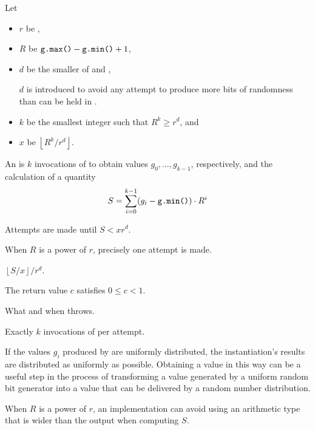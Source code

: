 \begin{itemdescr}
\pnum
Let
\begin{itemize}
\item $r$ be ,
\item $R$ be $\texttt{\protect g.max()} - \texttt{\protect g.min()} + 1$,
\item $d$ be the smaller of
   and ,
  \begin{footnote}
  $d$ is introduced to avoid any attempt
  to produce more bits of randomness
  than can be held in .
  \end{footnote}
\item $k$ be the smallest integer such that $R^k \ge r^d$, and
\item $x$ be $\left\lfloor R^k / r^d \right\rfloor$.
\end{itemize}
An  is $k$ invocations of 
to obtain values $g_0, \dotsc, g_{k-1}$, respectively,
and the calculation of a quantity
 \[
   S = \sum_{i=0}^{k-1} (g_i - \texttt{\protect g.min()})
                        \cdot R^i
 \]

\pnum
\effects
Attempts are made until $S < xr^d$.
\begin{note}
When $R$ is a power of $r$, precisely one attempt is made.
\end{note}

\pnum
\returns
$\left\lfloor S / x \right\rfloor / r^d$.
\begin{note}
The return value $c$ satisfies
$0 \leq c < 1$.
\end{note}

\pnum
\throws
What and when  throws.

\pnum
\complexity
Exactly $k$ invocations of  per attempt.

\pnum
\begin{note}
If the values $g_i$ produced by  are uniformly distributed,
the instantiation's results are distributed as uniformly as possible.
Obtaining a value in this way
can be a useful step
in the process of transforming
a value generated by a uniform random bit generator
into a value
that can be delivered by a random number distribution.
\end{note}

\pnum
\begin{note}
When $R$ is a power of $r$,
an implementation can avoid using an arithmetic type that is wider
than the output when computing $S$.
\end{note}
\end{itemdescr}

